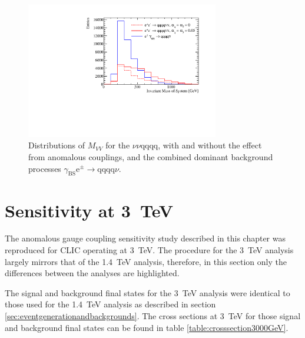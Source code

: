 \begin{figure}[h!]
\centering
\includegraphics[width=0.75\textwidth]{PhysicsAnalysis/Plots/NuisanceFit/1400GeV/NuisanceExplanation.pdf}
\caption[Distributions of $M_{VV}$ for the $\nu\nu\text{qqqq}$, with and without the effect from anomalous couplings, and the combined dominant background processes $\gamma_{\text{BS}}\text{e}^{\pm} \rightarrow \text{qqqq}\nu$.]{Distributions of $M_{VV}$ for the $\nu\nu\text{qqqq}$, with and without the effect from anomalous couplings, and the combined dominant background processes $\gamma_{\text{BS}}\text{e}^{\pm} \rightarrow \text{qqqq}\nu$.}
\label{fig:nuisanceexplanation1400GeV}
\end{figure}


\section{Sensitivity at 3~TeV}
The anomalous gauge coupling sensitivity study described in this chapter was reproduced for CLIC operating at 3~TeV.  The procedure for the 3~TeV analysis largely mirrors that of the 1.4~TeV analysis, therefore, in this section only the differences between the analyses are highlighted.  

The signal and background final states for the 3~TeV analysis were identical to those used for the 1.4~TeV analysis as described in section \ref{sec:eventgenerationandbackgrounds}.  The cross sections at 3~TeV for those signal and background final states can be found in table \ref{table:crosssection3000GeV}.  

